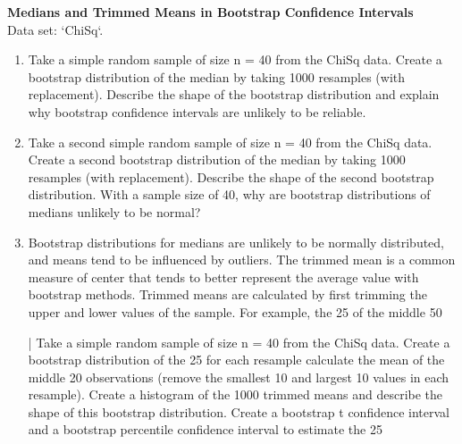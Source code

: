 \documentclass[
]{report}
\begin{document}
\begin{list}{E.}{ \setlength{\itemsep}{0.5em}}
  \item \textbf{Medians and Trimmed Means in Bootstrap Confidence Intervals} \\
  Data set: `ChiSq`. 
  \begin{enumerate}
    \setcounter{enumi}{0}  
    \item Take a simple random sample of size n = 40 from the ChiSq data. Create a bootstrap distribution
of the median by taking 1000 resamples (with replacement). Describe the shape of the bootstrap
distribution and explain why bootstrap confidence intervals are unlikely to be reliable.
    \item Take a second simple random sample of size n = 40 from the ChiSq data. Create a second bootstrap
distribution of the median by taking 1000 resamples (with replacement). Describe the shape
of the second bootstrap distribution. With a sample size of 40, why are bootstrap distributions of
medians unlikely to be normal?
    \item Bootstrap distributions for medians are unlikely to be normally distributed, and means tend to
be influenced by outliers. The trimmed mean is a common measure of center that tends to better
represent the average value with bootstrap methods. Trimmed means are calculated by first trimming
the upper and lower values of the sample. For example, the 25%
of the middle 50%

| Take a simple random sample of size n = 40 from the ChiSq data. Create a bootstrap distribution
of the 25%
for each resample calculate the mean of the middle 20 observations (remove the smallest 10 and
largest 10 values in each resample). Create a histogram of the 1000 trimmed means and describe
the shape of this bootstrap distribution. Create a bootstrap t confidence interval and a bootstrap
percentile confidence interval to estimate the 25%
  \end{enumerate}
  
  
  
  
  

\end{list}
\end{document}
